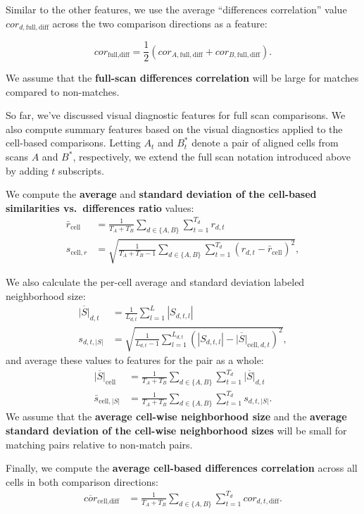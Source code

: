 \documentclass[11pt,]{isuthesis}
\begin{document}
Similar to the other features, we use the average ``differences correlation'' value \(cor_{d,\text{full},\text{diff}}\) across the two comparison directions as a feature:

\[
cor_{\text{full},\text{diff}} = \frac{1}{2}\left(cor_{A,\text{full},\text{diff}} + cor_{B,\text{full},\text{diff}}\right).
\]

We assume that the \textbf{full-scan differences correlation} will be large for matches compared to non-matches.

So far, we've discussed visual diagnostic features for full scan comparisons.
We also compute summary features based on the visual diagnostics applied to the cell-based comparisons.
Letting \(A_t\) and \(B_t^*\) denote a pair of aligned cells from scans \(A\) and \(B^*\), respectively, we extend the full scan notation introduced above by adding \(t\) subscripts.

We compute the \textbf{average} and \textbf{standard deviation of the cell-based similarities vs.~differences ratio} values:
\begin{align*}
\bar{r}_{\text{cell}} &= \frac{1}{T_A + T_B} \sum_{d \in \{A,B\}} \sum_{t = 1}^{T_d} r_{d,t} \\
s_{\text{cell}, r} &= \sqrt{\frac{1}{T_A + T_B - 1} \sum_{d \in \{A,B\}} \sum_{t = 1}^{T_d} (r_{d,t} - \bar{r}_{\text{cell}})^2},
\end{align*}

We also calculate the per-cell average and standard deviation labeled neighborhood size:
\begin{align*}
\overline{|S|}_{d,t} &= \frac{1}{L_{d,t}} \sum_{l=1}^L |S_{d,t,l}| \\
s_{d,t,|S|} &= \sqrt{\frac{1}{L_{d,t} - 1} \sum_{l=1}^{L_{d,t}} (|S_{d,t,l}| - \overline{|S|}_{\text{cell},d,t})^2},
\end{align*}
and average these values to features for the pair as a whole:
\begin{align*}
\overline{|S|}_{\text{cell}} &= \frac{1}{T_A + T_B} \sum_{d \in \{A,B\}} \sum_{t=1}^{T_d} \overline{|S|}_{d,t} \\
\bar{s}_{\text{cell},|S|} &= \frac{1}{T_A + T_B} \sum_{d \in \{A,B\}} \sum_{t=1}^{T_d} s_{d,t,|S|}.
\end{align*}
We assume that the \textbf{average cell-wise neighborhood size} and the \textbf{average standard deviation of the cell-wise neighborhood sizes} will be small for matching pairs relative to non-match pairs.

Finally, we compute the \textbf{average cell-based differences correlation} across all cells in both comparison directions:
\begin{align*}
\overline{cor}_{\text{cell},\text{diff}} &= \frac{1}{T_A + T_B} \sum_{d \in \{A,B\}} \sum_{t=1}^{T_d} cor_{d,t,\text{diff}}.
\end{align*}
\end{document}
